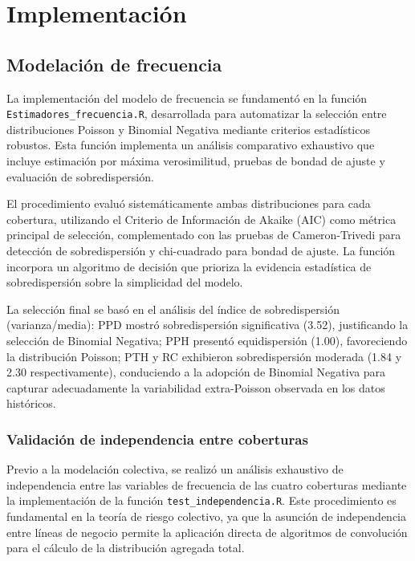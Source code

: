 \section{Implementación}

\subsection{Modelación de frecuencia}

La implementación del modelo de frecuencia se fundamentó en la función \texttt{Estimadores\_frecuencia.R}, desarrollada para automatizar la selección entre distribuciones Poisson y Binomial Negativa mediante criterios estadísticos robustos. Esta función implementa un análisis comparativo exhaustivo que incluye estimación por máxima verosimilitud, pruebas de bondad de ajuste y evaluación de sobredispersión.

El procedimiento evaluó sistemáticamente ambas distribuciones para cada cobertura, utilizando el Criterio de Información de Akaike (AIC) como métrica principal de selección, complementado con las pruebas de Cameron-Trivedi para detección de sobredispersión y chi-cuadrado para bondad de ajuste. La función incorpora un algoritmo de decisión que prioriza la evidencia estadística de sobredispersión sobre la simplicidad del modelo.

La selección final se basó en el análisis del índice de sobredispersión (varianza/media): PPD mostró sobredispersión significativa (3.52), justificando la selección de Binomial Negativa; PPH presentó equidispersión (1.00), favoreciendo la distribución Poisson; PTH y RC exhibieron sobredispersión moderada (1.84 y 2.30 respectivamente), conduciendo a la adopción de Binomial Negativa para capturar adecuadamente la variabilidad extra-Poisson observada en los datos históricos.

\subsubsection{Validación de independencia entre coberturas}

Previo a la modelación colectiva, se realizó un análisis exhaustivo de independencia entre las variables de frecuencia de las cuatro coberturas mediante la implementación de la función \texttt{test\_independencia.R}. Este procedimiento es fundamental en la teoría de riesgo colectivo, ya que la asunción de independencia entre líneas de negocio permite la aplicación directa de algoritmos de convolución para el cálculo de la distribución agregada total.

